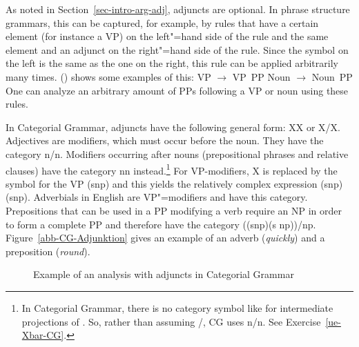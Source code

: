 As noted in Section~\ref{sec-intro-arg-adj}, adjuncts are optional. In phrase
structure grammars, this can be captured, for example, by rules that have a certain element (for
instance a VP) on the left"=hand side of the rule and the same element and an adjunct on the
right"=hand side of the rule. Since the symbol on the left is the same as the one on the right, this rule can be
applied arbitrarily many times. () shows some examples of this:
\eal
\ex VP $\to$ VP~PP
\ex Noun $\to$ Noun~PP
\zl
One can analyze an arbitrary amount of PPs following a VP or noun using these rules.

In Categorial Grammar, adjuncts have the following general form: X\bs X or X/X.
Adjectives are modifiers, which must occur before the noun. They have the category n/n.
Modifiers occurring after nouns (prepositional phrases and relative clauses) have the category
n\bs n instead.\footnote{%
	In Categorial Grammar, there is no category symbol like \xbar for intermediate projections of
	\xbart. So, rather than assuming \nbar/\nbar, CG uses n/n. See Exercise~\ref{ue-Xbar-CG}.
} For VP-modifiers, X is replaced by the symbol for the VP (s\bs np) and this yields the relatively complex expression (s\bs np)\bs (s\bs np).
Adverbials in English are VP"=modifiers and have this category. Prepositions that can be used in a PP modifying a verb require an NP in order to
form a complete PP and therefore have the category ((s\bs np)\bs (s\bs
np))/np. Figure~\vref{abb-CG-Adjunktion} gives an example of an adverb (\emph{quickly}) and a preposition (\emph{round}). 
%
\begin{figure}
\caption{\label{abb-CG-Adjunktion}Example of an analysis with adjuncts in Categorial Grammar}
\end{figure}%
